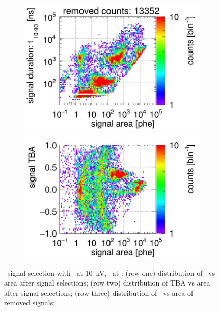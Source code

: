 \begin{landscape}
\begin{figure}[!p]
\begin{subfigure}[t]{0.32\textwidth}
			\includegraphics[width=\figurewidth,clip,trim={0 98 0 15}]{Figures/GasTest/CutsValid/res64766/pdpaX29Vecfig64766.jpg}
			\includegraphics[width=\figurewidth,clip,trim={0 8 0 40}]{Figures/GasTest/CutsValid/res64766/tbapaX29Vecfig64766.jpg}
			\caption{}
			\label{fig:signal selection dv 10 04}
		\end{subfigure}
		\caption[\gtest\ signal selection with \opdv\ at \SI{10}{\kV}, \opgd\ at \standarddensity .]{\gtest\ signal selection with \opdv\ at \SI{10}{\kV}, \opgd\ at \standarddensity : 
			(row one) distribution of \rpdshort\ vs area after signal selections;
			(row two) distribution of TBA vs area after signal selections;
			(row three) distribution of \rpdshort\ vs area of removed signals;
}
\end{figure}
\end{landscape}
